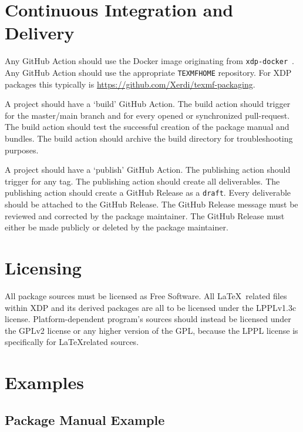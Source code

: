\documentclass{xdpdoc}
\begin{document}
\begin{multicols}{2}
        \section{Continuous Integration and Delivery}

        Any GitHub Action should use the Docker image originating from \texttt{xdp-docker}~\cite{xdp-docker}.
        Any GitHub Action should use the appropriate \texttt{TEXMFHOME} repository.
        For XDP packages this typically is \url{https://github.com/Xerdi/texmf-packaging}.

        A project should have a `build' GitHub Action.
        The build action should trigger for the master/main branch and for every opened or synchronized pull-request.
        The build action should test the successful creation of the package manual and bundles.
        The build action should archive the build directory for troubleshooting purposes.

        A project should have a `publish' GitHub Action.
        The publishing action should trigger for any tag.
        The publishing action should create all deliverables.
        The publishing action should create a GitHub Release as a \texttt{draft}.
        Every deliverable should be attached to the GitHub Release.
        The GitHub Release message must be reviewed and corrected by the package maintainer.
        The GitHub Release must either be made publicly or deleted by the package maintainer.


        \section{Licensing}

        All package sources must be licensed as Free Software.
        All \LaTeX\ related files within XDP and its derived packages are all to be licensed under the LPPLv1.3c license.
        Platform-dependent program's sources should instead be licensed under the GPLv2 license or any higher version of the GPL, because the LPPL license is specifically for \LaTeX related sources.

    \end{multicols}

    \clearpage


    \section{Examples}

    \subsection{Package Manual Example}
\end{document}
